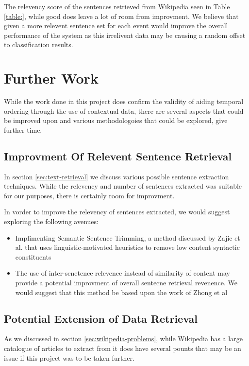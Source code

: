 \documentclass[bsc,frontabs,twoside,singlespacing,parskip,deptreport]{infthesis}     %
\begin{document}
The relevency score of the sentences retrieved from Wikipedia seen in Table \ref{table:}, while good does leave a lot of
room from improvment. We believe that given a more relevent sentence set for each event would improve the overall
performance of the system as this irrelivent data may be causing a random offset to classification results.

\section{Further Work}
While the work done in this project does confirm the validity of aiding temporal ordering through the use of contextual
data, there are several aspects that could be improved upon and various methodologoies that could be explored, give further
time.

\subsection{Improvment Of Relevent Sentence Retrieval}
In section \ref{sec:text-retrieval} we discuss various possible sentence extraction techniques.
While the relevency and number of sentences extracted was suitable for our purposes, there is certainly room for improvment.

In vorder to improve the relevency of sentences extracted, we would suggest exploring the following avenues:
\begin{itemize}
\item Implimenting Semantic Sentence Trimming, a method discussed by Zajic et al. \cite{zajic2005sentence} that
  uses linguistic-motivated heuristics to remove low content syntactic constituents 

\item The use of inter-senetence relevence instead of similarity of content may provide a potential improvment of
  overall sentecne retrieval revenence. We would suggest that this method be based upon the work of Zhong et al \cite{zhong2008practical}
\end{itemize}

\subsection{Potential Extension of Data Retrieval}
As we discussed in section \ref{sec:wikipedia-problems}, while Wikipedia has a large catalogue of articles to extract from
it does have several pounts that may be an issue if this project was to be taken further.
\end{document}

